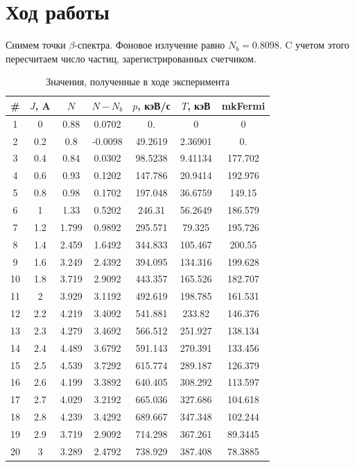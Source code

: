 \documentclass[a4paper, 12pt]{article}
\begin{document}
		\section{Ход работы}
		Снимем точки $\beta$-спектра. Фоновое излучение равно $N_b = 0.8098$. C учетом этого пересчитаем число частиц, зарегистрированных счетчиком.
		\begin{table}[!htb]
			\centering
			\caption{Значения, полученные в ходе эксперимента}
			\label{tab:experiment}
			\begin{tabular}{|c|c|c|c|c|c|c|}
				\hline
				\# & $J$, A & $N$ & $N-N_b$ & $p$, кэВ/с & $T$, кэВ & mkFermi\\
				\hline
				1 & 0 & 0.88 & 0.0702 & 0. & 0 & 0 \\
 2 & 0.2 & 0.8 & -0.0098 & 49.2619 & 2.36901 & 0. \\
 3 & 0.4 & 0.84 & 0.0302 & 98.5238 & 9.41134 & 177.702 \\
 4 & 0.6 & 0.93 & 0.1202 & 147.786 & 20.9414 & 192.976 \\
 5 & 0.8 & 0.98 & 0.1702 & 197.048 & 36.6759 & 149.15 \\
 6 & 1 & 1.33 & 0.5202 & 246.31 & 56.2649 & 186.579 \\
 7 & 1.2 & 1.799 & 0.9892 & 295.571 & 79.325 & 195.726 \\
 8 & 1.4 & 2.459 & 1.6492 & 344.833 & 105.467 & 200.55 \\
 9 & 1.6 & 3.249 & 2.4392 & 394.095 & 134.316 & 199.628 \\
 10 & 1.8 & 3.719 & 2.9092 & 443.357 & 165.526 & 182.707 \\
 11 & 2 & 3.929 & 3.1192 & 492.619 & 198.785 & 161.531 \\
 12 & 2.2 & 4.219 & 3.4092 & 541.881 & 233.82 & 146.376 \\
 13 & 2.3 & 4.279 & 3.4692 & 566.512 & 251.927 & 138.134 \\
 14 & 2.4 & 4.489 & 3.6792 & 591.143 & 270.391 & 133.456 \\
 15 & 2.5 & 4.539 & 3.7292 & 615.774 & 289.187 & 126.379 \\
 16 & 2.6 & 4.199 & 3.3892 & 640.405 & 308.292 & 113.597 \\
 17 & 2.7 & 4.029 & 3.2192 & 665.036 & 327.686 & 104.618 \\
 18 & 2.8 & 4.239 & 3.4292 & 689.667 & 347.348 & 102.244 \\
 19 & 2.9 & 3.719 & 2.9092 & 714.298 & 367.261 & 89.3445 \\
 20 & 3 & 3.289 & 2.4792 & 738.929 & 387.408 & 78.3885 \\

\end{tabular}
\end{table}
\end{document}
